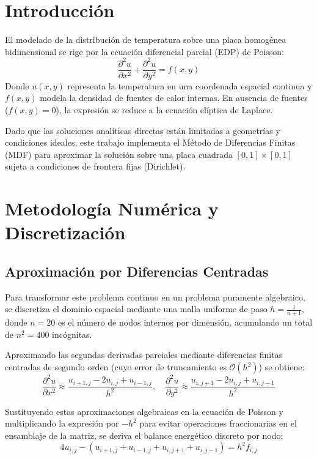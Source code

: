 \documentclass[12pt]{article}
\begin{document}
    \section{Introducción}
    El modelado de la distribución de temperatura sobre una placa homogénea bidimensional se rige por la ecuación diferencial parcial (EDP) de Poisson:
    \begin{equation}
    \frac{\partial^2 u}{\partial x^2} + \frac{\partial^2 u}{\partial y^2} = f(x,y)
    \end{equation}
    Donde $u(x,y)$ representa la temperatura en una coordenada espacial continua y $f(x,y)$ modela la densidad de fuentes de calor internas. En ausencia de fuentes ($f(x,y) = 0$), la expresión se reduce a la ecuación elíptica de Laplace. 

    Dado que las soluciones analíticas directas están limitadas a geometrías y condiciones ideales, este trabajo implementa el Método de Diferencias Finitas (MDF) para aproximar la solución sobre una placa cuadrada $[0,1] \times [0,1]$ sujeta a condiciones de frontera fijas (Dirichlet).

    \section{Metodología Numérica y Discretización}

    \subsection{Aproximación por Diferencias Centradas}
    Para transformar este problema continuo en un problema puramente algebraico, se discretiza el dominio espacial mediante una malla uniforme de paso $h = \frac{1}{n+1}$, donde $n=20$ es el número de nodos internos por dimensión, acumulando un total de $n^2 = 400$ incógnitas.

    Aproximando las segundas derivadas parciales mediante diferencias finitas centradas de segundo orden (cuyo error de truncamiento es $\mathcal{O}(h^2)$) se obtiene:
    \begin{equation}
    \frac{\partial^2 u}{\partial x^2} \approx \frac{u_{i+1,j} - 2u_{i,j} + u_{i-1,j}}{h^2}, \quad \frac{\partial^2 u}{\partial y^2} \approx \frac{u_{i,j+1} - 2u_{i,j} + u_{i,j-1}}{h^2}
    \end{equation}

    Sustituyendo estas aproximaciones algebraicas en la ecuación de Poisson y multiplicando la expresión por $-h^2$ para evitar operaciones fraccionarias en el ensamblaje de la matriz, se deriva el balance energético discreto por nodo:
    \begin{equation}
    4u_{i,j} - (u_{i+1,j} + u_{i-1,j} + u_{i,j+1} + u_{i,j-1}) = h^2 f_{i,j}
    \end{equation}
\end{document}
